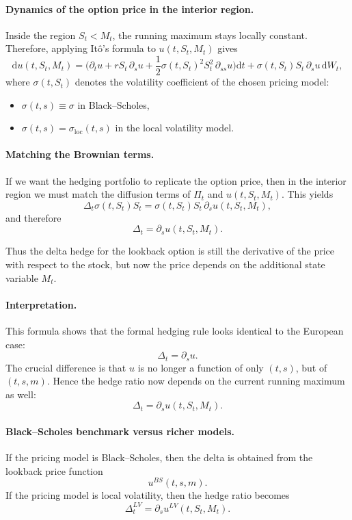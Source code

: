 \documentclass[11pt]{article}
\theoremstyle{plain}
\theoremstyle{definition}
\theoremstyle{remark}
\begin{document}
\paragraph{Dynamics of the option price in the interior region.}
Inside the region \(S_t<M_t\), the running maximum stays locally
constant.
Therefore, applying It\^o's formula to \(u(t,S_t,M_t)\) gives
\[
\mathrm{d}u(t,S_t,M_t)
=
\Big(
\partial_t u
+
rS_t\,\partial_s u
+
\frac12 \sigma(t,S_t)^2S_t^2\,\partial_{ss}u
\Big)\mathrm{d}t
+
\sigma(t,S_t)S_t\,\partial_s u\,\mathrm{d}W_t,
\]
where \(\sigma(t,S_t)\) denotes the volatility coefficient of the chosen
pricing model:
\begin{itemize}[leftmargin=1.4em]
    \item \(\sigma(t,s)\equiv \sigma\) in Black--Scholes,
    \item \(\sigma(t,s)=\sigma_{\mathrm{loc}}(t,s)\) in the local
    volatility model.
\end{itemize}

\paragraph{Matching the Brownian terms.}
If we want the hedging portfolio to replicate the option price, then in
the interior region we must match the diffusion terms of
\(\Pi_t\) and \(u(t,S_t,M_t)\).
This yields
\[
\Delta_t \sigma(t,S_t)S_t
=
\sigma(t,S_t)S_t\,\partial_s u(t,S_t,M_t),
\]
and therefore
\[
\boxed{
\Delta_t=\partial_s u(t,S_t,M_t).
}
\]

Thus the delta hedge for the lookback option is still the derivative of
the price with respect to the stock, but now the price depends on the
additional state variable \(M_t\).

\paragraph{Interpretation.}
This formula shows that the formal hedging rule looks identical to the
European case:
\[
\Delta_t=\partial_s u.
\]
The crucial difference is that \(u\) is no longer a function of only
\((t,s)\), but of \((t,s,m)\).
Hence the hedge ratio now depends on the current running maximum as
well:
\[
\Delta_t=\partial_s u(t,S_t,M_t).
\]

\paragraph{Black--Scholes benchmark versus richer models.}
If the pricing model is Black--Scholes, then the delta is obtained from
the lookback price function
\[
u^{BS}(t,s,m).
\]
If the pricing model is local volatility, then the hedge ratio becomes
\[
\Delta_t^{LV}=\partial_s u^{LV}(t,S_t,M_t).
\]
\end{document}
